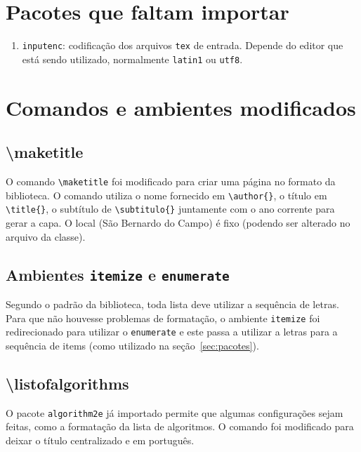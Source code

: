 \documentclass{fei}
\begin{document}
\section{Pacotes que faltam importar}

    \begin{enumerate}
        \item\texttt{inputenc}: codificação dos arquivos \texttt{tex} de entrada. Depende do editor que está sendo utilizado, normalmente \texttt{latin1} ou \texttt{utf8}.
    \end{enumerate}

\section{Comandos e ambientes modificados}
    
    \subsection{\textbackslash maketitle}
    
    O comando \verb+\maketitle+ foi modificado para criar uma página no formato da biblioteca. O comando utiliza o nome fornecido em \verb+\author{}+, o título em \verb+\title{}+, o subtítulo de \verb+\subtitulo{}+ juntamente com o ano corrente para gerar a capa. O local (São Bernardo do Campo) é fixo (podendo ser alterado no arquivo da classe).

    \subsection{Ambientes \texttt{itemize} e \texttt{enumerate}}
    
    Segundo o padrão da biblioteca, toda lista deve utilizar a sequência de letras. Para que não houvesse problemas de formatação, o ambiente \texttt{itemize} foi redirecionado para utilizar o \texttt{enumerate} e este passa a utilizar a letras para a sequência de items (como utilizado na seção~\ref{sec:pacotes}).
    
    \subsection{\textbackslash listofalgorithms}
    
    O pacote \texttt{algorithm2e} já importado permite que algumas configurações sejam feitas, como a formatação da lista de algoritmos. O comando foi modificado para deixar o título centralizado e em português.
    
\end{document}
